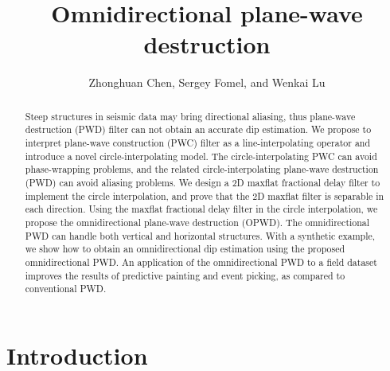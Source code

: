 \title{Omnidirectional plane-wave destruction}


\address{
\footnotemark[1] Department of Automation,\\
State Key Laboratory of Intelligent Technology and Systems\\
Tsinghua National Laboratory for Information Science and Technology \\
Tsinghua University \\
Beijing, China. 100084 \\
Email: zhonghuanchen@gmail.com. \\
\footnotemark[2]Bureau of Economic Geology, \\
Jackson School of Geosciences \\
The University of Texas at Austin \\
University Station, Box X \\
Austin, TX 78713-8924\\
Email: sergey.fomel@beg.utexas.edu.
}

\author{Zhonghuan Chen\footnotemark[1],
 Sergey Fomel\footnotemark[2], and Wenkai Lu\footnotemark[1]}




\begin{abstract}
Steep structures in seismic data may bring directional aliasing,
thus plane-wave destruction (PWD) filter 
can not obtain an accurate dip estimation.
We propose to interpret 
plane-wave construction (PWC) filter as a line-interpolating operator and 
introduce a novel circle-interpolating model.
The circle-interpolating PWC can avoid phase-wrapping problems,
and the related circle-interpolating plane-wave destruction (PWD)
can avoid aliasing problems.
We design a 2D maxflat fractional delay filter
to implement the circle interpolation,
and prove that
the 2D maxflat filter is separable in each direction.
Using the maxflat fractional delay filter in the circle interpolation,
we propose the omnidirectional plane-wave destruction (OPWD).
The omnidirectional PWD
can handle both vertical and horizontal structures.
With a synthetic example, we show
how to obtain an omnidirectional dip estimation using the proposed 
omnidirectional PWD.
An application of the omnidirectional PWD to a field dataset 
improves the results of predictive painting and event picking,
as compared to conventional PWD.
\end{abstract}

\section{Introduction}

